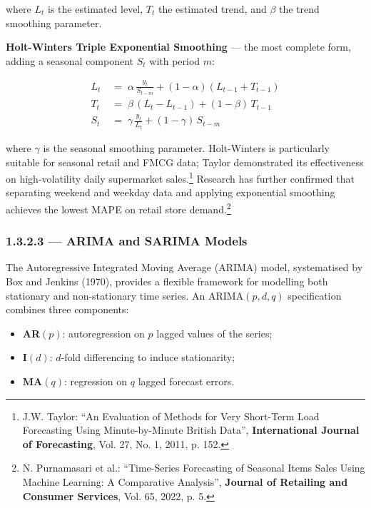 \noindent where $L_t$ is the estimated level, $T_t$ the estimated trend,
and $\beta$ the trend smoothing parameter.

\medskip
\noindent\textbf{Holt-Winters Triple Exponential Smoothing} — the most
complete form, adding a seasonal component $S_t$ with period $m$:

\begin{align}
  L_t &\;=\; \alpha\,\frac{y_t}{S_{t-m}}
        + (1-\alpha)(L_{t-1}+T_{t-1}) \\[3pt]
  T_t &\;=\; \beta\,(L_t-L_{t-1}) + (1-\beta)\,T_{t-1} \\[3pt]
  S_t &\;=\; \gamma\,\frac{y_t}{L_t} + (1-\gamma)\,S_{t-m}
\end{align}

\noindent where $\gamma$ is the seasonal smoothing parameter. Holt-Winters
is particularly suitable for seasonal retail and FMCG data; Taylor
demonstrated its effectiveness on high-volatility daily supermarket
sales.\footnote{J.W. Taylor: ``An Evaluation of Methods for Very
Short-Term Load Forecasting Using Minute-by-Minute British Data'',
\textbf{International Journal of Forecasting}, Vol. 27, No. 1, 2011,
p. 152.} Research has further confirmed that separating weekend and weekday
data and applying exponential smoothing achieves the lowest MAPE on retail
store demand.\footnote{N. Purnamasari et al.: ``Time-Series Forecasting of
Seasonal Items Sales Using Machine Learning: A Comparative Analysis'',
\textbf{Journal of Retailing and Consumer Services}, Vol. 65, 2022, p. 5.}

\subsubsection{1.3.2.3 — ARIMA and SARIMA Models}

The Autoregressive Integrated Moving Average (ARIMA) model, systematised by
Box and Jenkins (1970), provides a flexible framework for modelling both
stationary and non-stationary time series. An ARIMA$(p, d, q)$ specification
combines three components:

\begin{itemize}
  \item \textbf{AR$(p)$}: autoregression on $p$ lagged values of the
        series;
  \item \textbf{I$(d)$}: $d$-fold differencing to induce stationarity;
  \item \textbf{MA$(q)$}: regression on $q$ lagged forecast errors.
\end{itemize}

